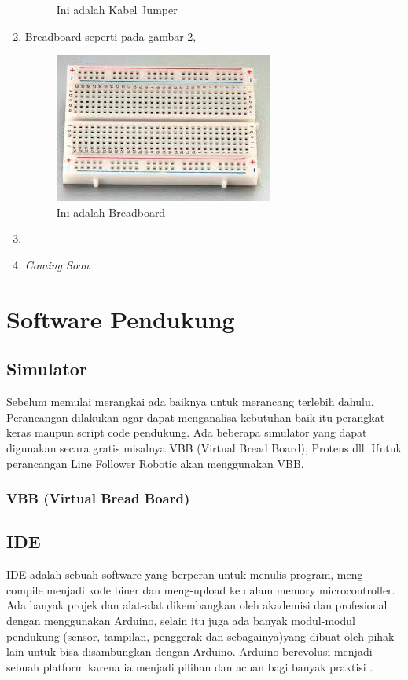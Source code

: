 \begin{enumerate}
\begin{figure}[!htbp]
  \caption{Ini adalah Kabel Jumper}\label{fig:jumper}
\end{figure}
  \item Breadboard seperti pada gambar \ref{fig:breadboard},
  \begin{figure}[!htbp]
  \centering
  \includegraphics[width=.75\textwidth]{figures/Arduino/breadboard.jpg}
  \caption{Ini adalah Breadboard}\label{fig:breadboard}
\end{figure}
  \item
  \item \textit{Coming Soon}
\end{enumerate}

\section{Software Pendukung}
\subsection{Simulator}
Sebelum memulai merangkai ada baiknya untuk merancang terlebih dahulu. Perancangan dilakukan agar dapat menganalisa kebutuhan baik itu perangkat keras maupun script code pendukung. Ada beberapa simulator yang dapat digunakan secara gratis misalnya VBB (Virtual Bread Board), Proteus dll. Untuk perancangan Line Follower Robotic akan menggunakan VBB.
\subsubsection{VBB (Virtual Bread Board)}


\subsection{IDE}
IDE adalah sebuah software yang berperan untuk menulis program, meng-compile menjadi kode biner dan meng-upload ke dalam memory microcontroller. Ada banyak projek dan alat-alat dikembangkan oleh akademisi dan profesional dengan menggunakan Arduino, selain itu juga ada banyak modul-modul pendukung (sensor, tampilan, penggerak dan sebagainya)yang dibuat oleh pihak lain untuk bisa disambungkan dengan Arduino. Arduino berevolusi menjadi sebuah platform karena ia menjadi pilihan dan acuan bagi banyak praktisi \cite{djuandi2011pengenalan}.

